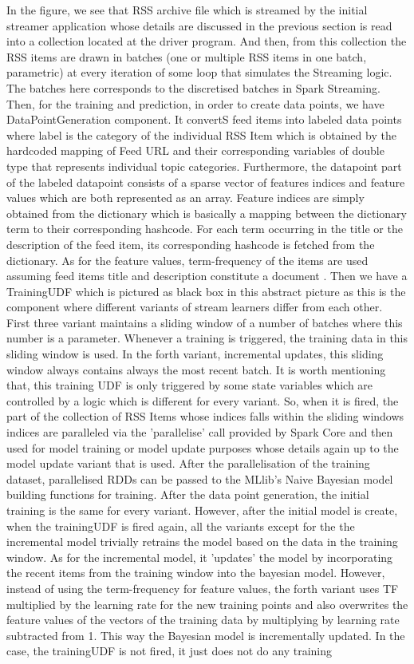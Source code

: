 \documentclass[12pt]{article}
\begin{document}
In the figure, we see that RSS archive file which is streamed by the initial streamer application whose details are discussed in the previous section is read into a collection located at the driver program. And then, from this collection the RSS items are drawn in batches (one or multiple RSS items in one batch, parametric) at every iteration of some loop that simulates the Streaming logic. The batches here corresponds to the discretised batches in Spark Streaming. Then, for the training and prediction, in order to create data points, we have DataPointGeneration component. It convertS feed items into labeled data points where label is the category of the individual RSS Item which is obtained by the hardcoded mapping of Feed URL and their corresponding variables of double type that represents individual topic categories. Furthermore, the datapoint part of the labeled datapoint consists of a sparse vector of features indices and feature values which are both represented as an array. Feature indices are simply obtained from the dictionary which is basically a mapping between the dictionary term to their corresponding hashcode. For each term occurring in the title or the description of the feed item, its corresponding hashcode is fetched from the dictionary. As for the feature values, term-frequency of the items are used assuming feed items title and description constitute a document . Then we have a TrainingUDF which is pictured as black box in this abstract picture as this is the component where different variants of stream learners differ from each other. First three variant maintains a sliding window of a number of batches where this number is a parameter. Whenever a training is triggered, the training data in this sliding window is used. In the forth variant, incremental updates, this sliding window always contains always the most recent batch. It is worth mentioning that, this training UDF is only triggered by some state variables which are controlled by a logic which is different for every variant. So, when it is fired, the part of the collection of RSS Items whose indices falls within the sliding windows indices are paralleled via the 'parallelise' call provided by Spark Core and then used for model training or model update purposes whose details again up to the model update variant that is used. After the parallelisation of the training dataset, parallelised RDDs can be passed to the MLlib's Naive Bayesian model building functions for training. After the data point generation, the initial training is the same for every variant. However, after the initial model is create, when the trainingUDF is fired again, all the variants except for the the incremental model trivially retrains the model based on the data in the training window. As for the incremental model, it 'updates' the model by incorporating the recent items  from the training window into the bayesian model. However, instead of using the term-frequency for feature values, the forth variant uses TF multiplied by the learning rate for the new training points and also overwrites the feature values of the vectors of the training data by multiplying by learning rate subtracted from 1. This way the Bayesian model is incrementally updated. In the case, the trainingUDF is not fired, it just does not do any training 
\end{document}
